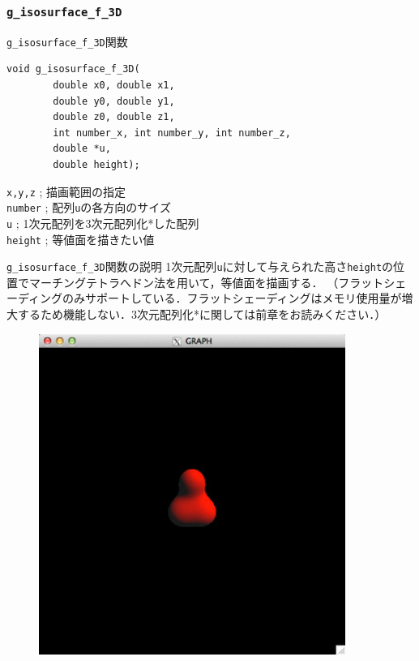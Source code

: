 \documentclass[platex,a4paper,12pt]{jsarticle}%
\begin{document}
\begin{figure}[htb]
\end{figure}


\clearpage
\subsubsection{\texttt{g\_isosurface\_f\_3D}}

\begin{itembox}[l]{\texttt{g\_isosurface\_f\_3D}関数}
\begin{verbatim}
void g_isosurface_f_3D(
        double x0, double x1,
        double y0, double y1,
        double z0, double z1,
        int number_x, int number_y, int number_z,
        double *u,
        double height);
\end{verbatim}
\verb|x,y,z| ; 描画範囲の指定\\
\verb|number| ; 配列\verb|u|の各方向のサイズ\\
\verb|u| ; 1次元配列を3次元配列化*した配列\\
\verb|height| ; 等値面を描きたい値
\end{itembox}

\begin{itembox}[l]{\texttt{g\_isosurface\_f\_3D}関数の説明}
1次元配列\verb|u|に対して与えられた高さ\verb|height|の位置でマーチングテトラへドン法を用いて，等値面を描画する．
（フラットシェーディングのみサポートしている．フラットシェーディングはメモリ使用量が増大するため機能しない．3次元配列化*に関しては前章をお読みください．）
\end{itembox}

\begin{figure}[htb]
\centering
	\includegraphics[width=100mm]{./Figures/eps/Canvas_g_isosurface.eps}
\end{figure}
\end{document}
